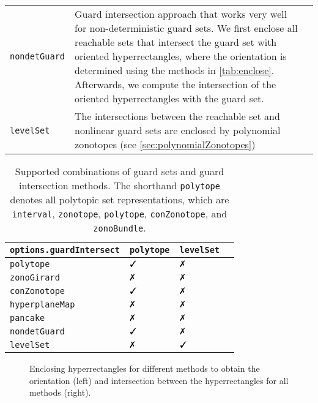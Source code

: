 \begin{table*}
\begin{tabular}{l p{10cm} c}
        \texttt{nondetGuard}   & Guard intersection approach that works very well for non-deterministic guard sets. We first enclose all reachable sets that intersect the guard set with oriented hyperrectangles, where the orientation is determined using the methods in \cref{tab:enclose}. Afterwards, we compute the intersection of the oriented hyperrectangles with the guard set. & \\
        \texttt{levelSet}      & The intersections between the reachable set and nonlinear guard sets are enclosed by polynomial zonotopes (see \cref{sec:polynomialZonotopes}) & \cite{Kochdumper2020d} \\
        \bottomrule
    \end{tabular}
\end{table*}

\begin{table*}
    \centering
    \caption{Supported combinations of guard sets and guard intersection methods. The shorthand \texttt{polytope} denotes all polytopic set representations, which are \texttt{interval}, \texttt{zonotope}, \texttt{polytope}, \texttt{conZonotope}, and \texttt{zonoBundle}.}
    \label{tab:guardSet}
    \begin{tabular}{ p{4.5cm} C{3cm} C{3cm} C{3cm}}
        \toprule
        \texttt{options.guardIntersect} & \texttt{polytope} & \texttt{levelSet} \\ \midrule
        \texttt{polytope}               & $\cmark$          & $\xmark$          \\
        \texttt{zonoGirard}             & $\xmark$          & $\xmark$          \\
        \texttt{conZonotope}            & $\cmark$          & $\xmark$          \\
        \texttt{hyperplaneMap}          & $\xmark$          & $\xmark$          \\
        \texttt{pancake}                & $\xmark$          & $\xmark$          \\
        \texttt{nondetGuard}            & $\cmark$          & $\xmark$          \\
        \texttt{levelSet}               & $\xmark$          & $\cmark$          \\
        \bottomrule
    \end{tabular}
\end{table*}

\begin{figure}[htb]
    \centering
    \caption{Enclosing hyperrectangles for different methods to obtain the orientation (left) and intersection between the hyperrectangles for all methods (right).}
    \label{fig:enclose}
\end{figure}
